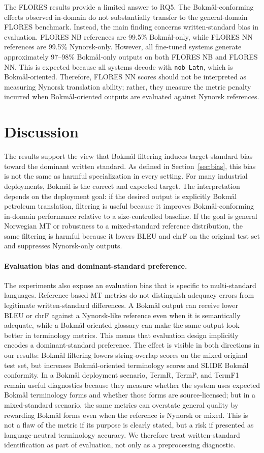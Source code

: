 \documentclass[11pt]{article}
\newcommand{\nb}{Bokm{\aa}l}
\newcommand{\nn}{Nynorsk}
\begin{document}
The FLORES results provide a limited answer to RQ5. The \nb{}-conforming effects observed in-domain do not substantially transfer to the general-domain FLORES benchmark. Instead, the main finding concerns written-standard bias in evaluation. FLORES NB references are 99.5\% \nb{}-only, while FLORES NN references are 99.5\% \nn{}-only. However, all fine-tuned systems generate approximately 97--98\% \nb{}-only outputs on both FLORES NB and FLORES NN. This is expected because all systems decode with \texttt{nob\_Latn}, which is \nb{}-oriented. Therefore, FLORES NN scores should not be interpreted as measuring \nn{} translation ability; rather, they measure the metric penalty incurred when \nb{}-oriented outputs are evaluated against \nn{} references.

\section{Discussion}

The results support the view that \nb{} filtering induces target-standard bias toward the dominant written standard. As defined in Section~\ref{sec:bias}, this bias is not the same as harmful specialization in every setting. For many industrial deployments, \nb{} is the correct and expected target. The interpretation depends on the deployment goal: if the desired output is explicitly \nb{} petroleum translation, filtering is useful because it improves \nb{}-conforming in-domain performance relative to a size-controlled baseline. If the goal is general Norwegian MT or robustness to a mixed-standard reference distribution, the same filtering is harmful because it lowers BLEU and chrF on the original test set and suppresses \nn{}-only outputs.

\paragraph{Evaluation bias and dominant-standard preference.}
The experiments also expose an evaluation bias that is specific to multi-standard languages. Reference-based MT metrics do not distinguish adequacy errors from legitimate written-standard differences. A \nb{} output can receive lower BLEU or chrF against a \nn{}-like reference even when it is semantically adequate, while a \nb{}-oriented glossary can make the same output look better in terminology metrics. This means that evaluation design implicitly encodes a dominant-standard preference. The effect is visible in both directions in our results: \nb{} filtering lowers string-overlap scores on the mixed original test set, but increases \nb{}-oriented terminology scores and SLIDE \nb{} conformity. In a \nb{} deployment scenario, TermR, TermP, and TermF1 remain useful diagnostics because they measure whether the system uses expected \nb{} terminology forms and whether those forms are source-licensed; but in a mixed-standard scenario, the same metrics can overstate general quality by rewarding \nb{} forms even when the reference is \nn{} or mixed. This is not a flaw of the metric if its purpose is clearly stated, but a risk if presented as language-neutral terminology accuracy. We therefore treat written-standard identification as part of evaluation, not only as a preprocessing diagnostic.
\end{document}
